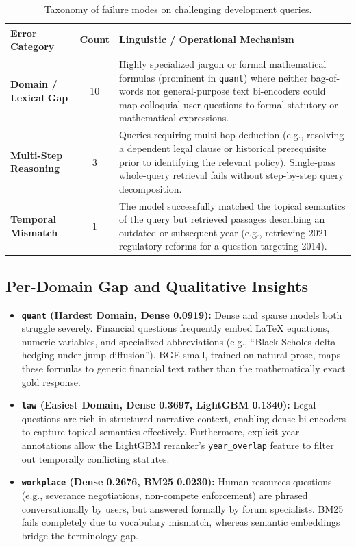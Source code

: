 \begin{table}[h]
\centering
\small
\caption{Taxonomy of failure modes on challenging development queries.}
\label{tab:error_categories}
\begin{tabular}{lcp{9.0cm}}
\toprule
\textbf{Error Category} & \textbf{Count} & \textbf{Linguistic / Operational Mechanism} \\
\midrule
\textbf{Domain / Lexical Gap} & 10 & Highly specialized jargon or formal mathematical formulas (prominent in \texttt{quant}) where neither bag-of-words nor general-purpose text bi-encoders could map colloquial user questions to formal statutory or mathematical expressions. \\
\addlinespace
\textbf{Multi-Step Reasoning} & 3 & Queries requiring multi-hop deduction (e.g., resolving a dependent legal clause or historical prerequisite prior to identifying the relevant policy). Single-pass whole-query retrieval fails without step-by-step query decomposition. \\
\addlinespace
\textbf{Temporal Mismatch} & 1 & The model successfully matched the topical semantics of the query but retrieved passages describing an outdated or subsequent year (e.g., retrieving 2021 regulatory reforms for a question targeting 2014). \\
\bottomrule
\end{tabular}
\end{table}

\subsection{Per-Domain Gap and Qualitative Insights}
\begin{itemize}
    \item \textbf{\texttt{quant} (Hardest Domain, Dense 0.0919):} Dense and sparse models both struggle severely. Financial questions frequently embed LaTeX equations, numeric variables, and specialized abbreviations (e.g., ``Black-Scholes delta hedging under jump diffusion''). BGE-small, trained on natural prose, maps these formulas to generic financial text rather than the mathematically exact gold response.
    \item \textbf{\texttt{law} (Easiest Domain, Dense 0.3697, LightGBM 0.1340):} Legal questions are rich in structured narrative context, enabling dense bi-encoders to capture topical semantics effectively. Furthermore, explicit year annotations allow the LightGBM reranker's \texttt{year\_overlap} feature to filter out temporally conflicting statutes.
    \item \textbf{\texttt{workplace} (Dense 0.2676, BM25 0.0230):} Human resources questions (e.g., severance negotiations, non-compete enforcement) are phrased conversationally by users, but answered formally by forum specialists. BM25 fails completely due to vocabulary mismatch, whereas semantic embeddings bridge the terminology gap.
\end{itemize}
